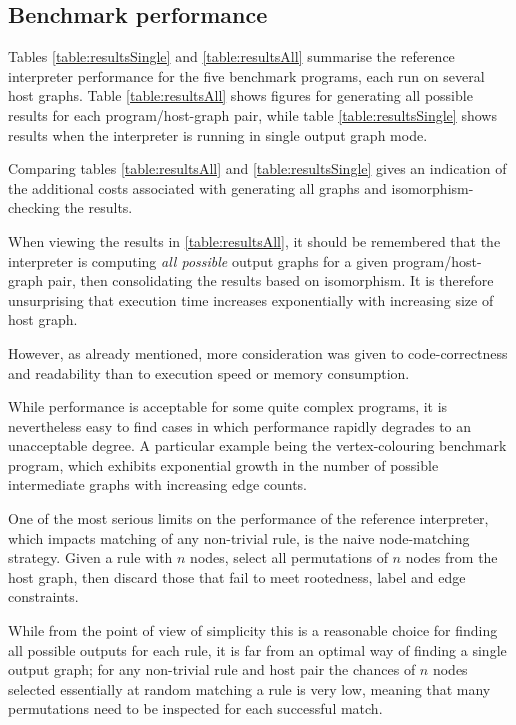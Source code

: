 \subsection{Benchmark performance}

Tables \ref{table:resultsSingle} and \ref{table:resultsAll} summarise the reference interpreter performance for the five benchmark programs, each run on several host graphs. Table \ref{table:resultsAll} shows figures for generating all possible results for each program/host-graph pair, while table \ref{table:resultsSingle} shows results when the interpreter is running in single output graph mode.

Comparing tables \ref{table:resultsAll} and \ref{table:resultsSingle} gives an indication of the additional costs associated with generating all graphs and isomorphism-checking the results.




When viewing the results in \ref{table:resultsAll}, it should be remembered that the interpreter is computing \textit{all possible} output graphs for a given program/host-graph pair, then consolidating the results based on isomorphism. It is therefore unsurprising that execution time increases exponentially with increasing size of host graph.

However, as already mentioned, more consideration was given to code-correctness and readability than to execution speed or memory consumption.

While performance is acceptable for some quite complex programs, it is nevertheless easy to find cases in which performance rapidly degrades to an unacceptable degree. A particular example being the vertex-colouring benchmark program, which exhibits exponential growth in the number of possible intermediate graphs with increasing edge counts.

One of the most serious limits on the performance of the reference interpreter, which impacts matching of any non-trivial rule, is the naive node-matching strategy. Given a rule with $n$ nodes, select all permutations of $n$ nodes from the host graph, then discard those that fail to meet rootedness, label and edge constraints.

While from the point of view of simplicity this is a reasonable choice for finding all possible outputs for each rule, it is far from an optimal way of finding a single output graph; for any non-trivial rule and host pair the chances of $n$ nodes selected essentially at random matching a rule is very low, meaning that many permutations need to be inspected for each successful match.

